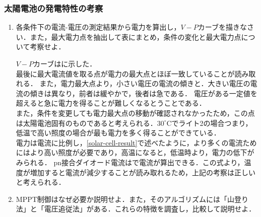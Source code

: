 \clearpage
\subsubsection{太陽電池の発電特性の考察}
\begin{enumerate}[(1)]
	\item 各条件下の電流-電圧の測定結果から電力を算出し，$V-P$カーブを描きなさい．また，最大電力点を抽出して表にまとめ，条件の変化と最大電力点について考察せよ．
	
	$V-P$カーブはに示した．\\
	最後に最大電流値を取る点が電力の最大点とほぼ一致していることが読み取れる．
	また，電力最大点より，小さい電圧の電流の傾きと．大きい電圧の電流の傾きは異なり，前者は緩やかで，後者は急である．
	電圧がある一定値を超えると急に電力を得ることが難しくなるとうことである．\\
	また，条件を変更しても電力最大点の移動が確認されなかったため，この点は太陽電池固有のものであると考えられる．$30^{\circ}$Cでライト2の場合つまり，低温で高い照度の場合が最も電力を多く得ることができている．\\
	電力は電流に比例し，\ref{solar-cell-result}で述べたように，より多くの電流ためにはより高い照度が必要であり，高温になると，低温時より，電力の低下がみられる．
	pn接合ダイオード電流はで電流が算出できる．この式より，温度が増加すると電流が減少することが読み取れるため，上記の考察は正しいと考えられる．
	\item MPPT制御はなぜ必要か説明せよ．また，そのアルゴリズムには「山登り法」と「電圧追従法」がある．これらの特徴を調査し，比較して説明せよ．
	

\end{enumerate}
